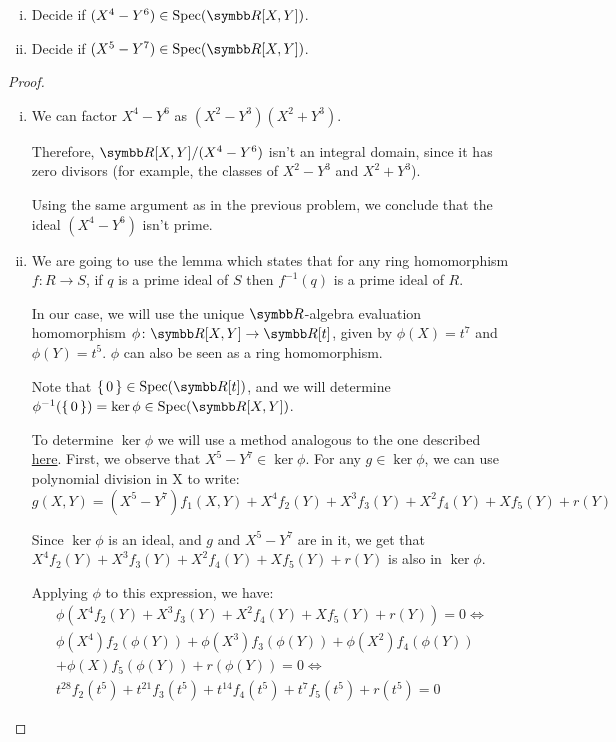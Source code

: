 \begin{problem}\hfill
\begin{enumerate}[(i)]
    \item Decide if \((X^4 - Y^6) \in \Spec(\reals[X, Y])\).
    \item Decide if \((X^5 - Y^7) \in \Spec(\reals[X, Y])\).
\end{enumerate}
\end{problem}
\begin{proof}\hfill
\begin{enumerate}[(i)]
    \item We can factor \(X^4 - Y^6\) as \((X^2 - Y^3)(X^2 + Y^3)\).
    
    Therefore, \(\reals[X, Y]/(X^4-Y^6)\) isn't an integral domain, since it has zero divisors (for example, the classes of \(X^2 - Y^3\) and \(X^2 + Y^3\)).
    
    Using the same argument as in the previous problem, we conclude that the ideal \((X^4 - Y^6)\) isn't prime.
    
    \item We are going to use the lemma which states that for any ring homomorphism \(f \colon R \to S\), if \(q\) is a prime ideal of \(S\) then \(f^{-1}(q)\) is a prime ideal of \(R\).
    
    In our case, we will use the unique \(\reals\)-algebra evaluation homomorphism \(\phi \colon \reals[X, Y] \to \reals[t]\), given by \(\phi(X) = t^7\) and \(\phi(Y) = t^5\). \(\phi\) can also be seen as a ring homomorphism.
    
    Note that \(\set{0} \in \Spec(\reals[t])\), and we will determine \(\phi^{-1}(\set{0}) = \ker \phi \in \Spec(\reals[X, Y])\).

    To determine \(\ker \phi\) we will use a method analogous to the one described \href{https://math.stackexchange.com/a/488437/388180}{here}.
    First, we observe that \(X^5 - Y^7 \in \ker \phi\). For any \(g \in \ker \phi\), we can use polynomial division in X to write:
    \[g(X, Y) = (X^5 - Y^7) f_1(X, Y) + X^4 f_2 (Y) + X^3 f_3 (Y) + X^2 f_4 (Y) + X f_5 (Y) + r(Y)\]
    
    Since \(\ker \phi\) is an ideal, and \(g\) and \(X^5 - Y^7\) are in it, we get that \(X^4 f_2 (Y) + X^3 f_3 (Y) + X^2 f_4 (Y) + X f_5 (Y) + r(Y)\) is also in \(\ker \phi\).
    
    Applying \(\phi\) to this expression, we have:
    \begin{gather*}
        \phi(X^4 f_2 (Y) + X^3 f_3 (Y) + X^2 f_4 (Y) + X f_5 (Y) + r(Y)) = 0 \iff \\
        \phi(X^4) f_2(\phi(Y)) + \phi(X^3) f_3(\phi(Y)) + \phi(X^2) f_4(\phi(Y)) \\
        + \phi(X) f_5(\phi(Y)) + r(\phi(Y)) = 0 \iff \\
        t^{28} f_2(t^5) + t^{21} f_3(t^5) + t^{14} f_4(t^5) + t^7 f_5(t^5) + r(t^5) = 0
    \end{gather*}
    

\end{enumerate}
\end{proof}
